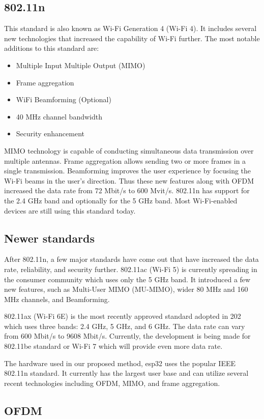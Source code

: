 \subsection{802.11n}
This standard is also known as Wi-Fi Generation 4 (Wi-Fi 4). It includes several new technologies that increased the capability of Wi-Fi further. The most notable additions to this standard are:
\begin{itemize}
    \item Multiple Input Multiple Output (MIMO)
    \item Frame aggregation
    \item WiFi Beamforming (Optional)
    \item 40 MHz channel bandwidth
    \item Security enhancement
\end{itemize}
MIMO technology is capable of conducting simultaneous data transmission over multiple antennas. Frame aggregation allows sending two or more frames in a single transmission. Beamforming improves the user experience by focusing the Wi-Fi beams in the user's direction. Thus these new features along with OFDM increased the data rate from 72 Mbit/s to 600 Mvit/s. 802.11n has support for the 2.4 GHz band and optionally for the 5 GHz band. Most Wi-Fi-enabled devices are still using this standard today.

\subsection{Newer standards}
After 802.11n, a few major standards have come out that have increased the data rate, reliability, and security further. 802.11ac (Wi-Fi 5) is currently spreading in the consumer community which uses only the 5 GHz band. It introduced a few new features, such as Multi-User MIMO (MU-MIMO), wider 80 MHz and 160 MHz channels, and Beamforming. 

802.11ax (Wi-Fi 6E) is the most recently approved standard adopted in 202 which uses three bands: 2.4 GHz, 5 GHz, and 6 GHz. The data rate can vary from 600 Mbit/s to 9608 Mbit/s. Currently, the development is being made for 802.11be standard or Wi-Fi 7 which will provide even more data rate.

The hardware used in our proposed method, esp32 uses the popular IEEE 802.11n standard. It currently has the largest user base and can utilize several recent technologies including OFDM, MIMO, and frame aggregation.

\subsection{OFDM}


